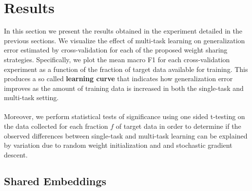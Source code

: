 \chapter{Results}
In this section we present the results obtained in the experiment detailed in the previous sections. We visualize the effect of multi-task learning on generalization error estimated by cross-validation for each of the proposed weight sharing strategies. Specifically, we plot the mean macro F1 for each cross-validation experiment as a function of the fraction of target data available for training. This produces a so called \textbf{learning curve} that indicates how generalization error improves as the amount of training data is increased in both the single-task and multi-task setting.
\\\\
Moreover, we perform statistical tests of significance using one sided t-testing on the data collected for each fraction $f$ of target data in order to determine if the observed differences between single-task and multi-task learning can be explained by variation due to random weight initialization and and stochastic gradient descent.
\newpage
\section{Shared Embeddings}
\newpage

